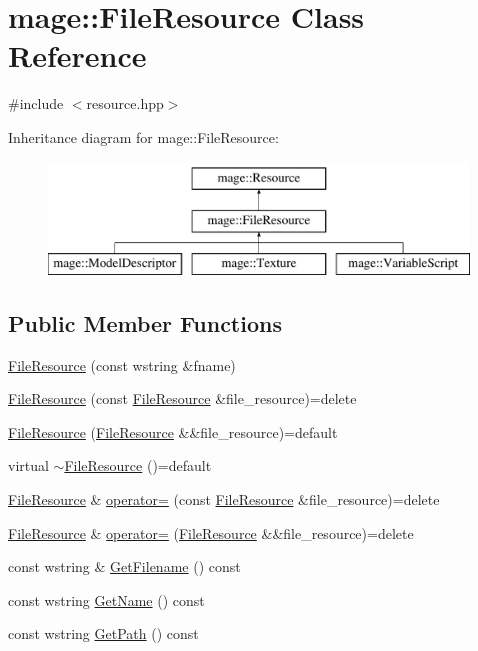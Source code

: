 \hypertarget{classmage_1_1_file_resource}{}\section{mage\+:\+:File\+Resource Class Reference}
\label{classmage_1_1_file_resource}


{\ttfamily \#include $<$resource.\+hpp$>$}

Inheritance diagram for mage\+:\+:File\+Resource\+:\begin{figure}[H]
\begin{center}
\leavevmode
\includegraphics[height=3.000000cm]{classmage_1_1_file_resource}
\end{center}
\end{figure}
\subsection*{Public Member Functions}
\begin{DoxyCompactItemize}
\item 
\hyperlink{classmage_1_1_file_resource_ab126d9301d81c55b2aaacff86437e2d4}{File\+Resource} (const wstring \&fname)
\item 
\hyperlink{classmage_1_1_file_resource_a5aa20ee42fcfc4ee6877438ed7377930}{File\+Resource} (const \hyperlink{classmage_1_1_file_resource}{File\+Resource} \&file\+\_\+resource)=delete
\item 
\hyperlink{classmage_1_1_file_resource_a31bf9e2b425e284e2ed65bf18cd7af7b}{File\+Resource} (\hyperlink{classmage_1_1_file_resource}{File\+Resource} \&\&file\+\_\+resource)=default
\item 
virtual \hyperlink{classmage_1_1_file_resource_a91ed639ff33311ebdfb54c80be7d6f62}{$\sim$\+File\+Resource} ()=default
\item 
\hyperlink{classmage_1_1_file_resource}{File\+Resource} \& \hyperlink{classmage_1_1_file_resource_a195da42fa3a40991e7c38cf8305b0bf2}{operator=} (const \hyperlink{classmage_1_1_file_resource}{File\+Resource} \&file\+\_\+resource)=delete
\item 
\hyperlink{classmage_1_1_file_resource}{File\+Resource} \& \hyperlink{classmage_1_1_file_resource_a7ec207d6e9cb0bc4b8020aa73df986b6}{operator=} (\hyperlink{classmage_1_1_file_resource}{File\+Resource} \&\&file\+\_\+resource)=delete
\item 
const wstring \& \hyperlink{classmage_1_1_file_resource_a5930e472973b3e0d9b09dc9d031bacf1}{Get\+Filename} () const
\item 
const wstring \hyperlink{classmage_1_1_file_resource_a8bc3308e018b352157bbcfe3a85519f9}{Get\+Name} () const
\item 
const wstring \hyperlink{classmage_1_1_file_resource_a6dd2da5d50dbe8b3ac4189cdaa5fc325}{Get\+Path} () const
\end{DoxyCompactItemize}


